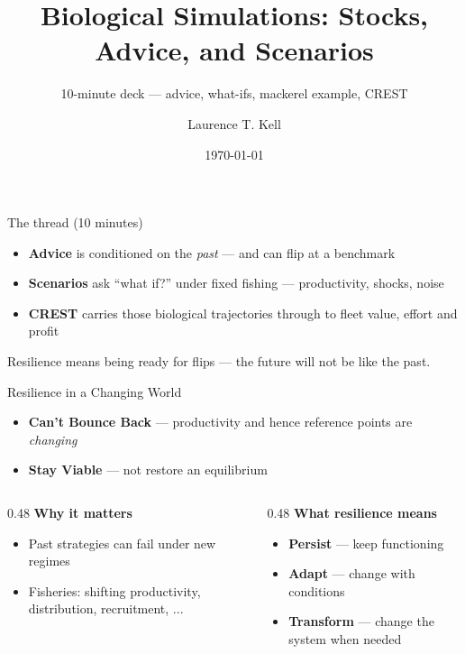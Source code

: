 \documentclass[12pt,aspectratio=169]{beamer}
\title[BIM Resilience --- 10 min]{Biological Simulations: Stocks, Advice, and Scenarios}
\subtitle{10-minute deck --- advice, what-ifs, mackerel example, CREST}
\author{Laurence T. Kell}
\institute{BIM Resilience Project}
\date{\today}
\begin{document}

\begin{frame}{The thread (10 minutes)}
  \begin{itemize}
    \item \textbf{Advice} is conditioned on the \emph{past} --- and can flip at a benchmark
    \item \textbf{Scenarios} ask ``what if?'' under fixed fishing --- productivity, shocks, noise
    \item \textbf{CREST} carries those biological trajectories through to fleet value, effort and profit
  \end{itemize}
  \vspace{4mm}
  {\footnotesize\textcolor{bimsteel}{Resilience means being ready for flips --- the future will not be like the past.}}
\end{frame}

\begin{frame}{Resilience in a Changing World}
  \footnotesize
  \begin{itemize}
    \item \textbf{Can't Bounce Back} --- productivity and hence reference points are \emph{changing}
    \item \textbf{Stay Viable} --- not restore an equilibrium
  \end{itemize}
  \vspace{2mm}
  \begin{columns}[T]
    \begin{column}{0.48\textwidth}
      \textbf{Why it matters}
      \begin{itemize}
        \item Past strategies can fail under new regimes
        \item Fisheries: shifting productivity, distribution, recruitment, ...
      \end{itemize}
    \end{column}
    \begin{column}{0.48\textwidth}
      \textbf{What resilience means}
      \begin{itemize}
        \item \textbf{Persist} --- keep functioning
        \item \textbf{Adapt} --- change with conditions
        \item \textbf{Transform} --- change the system when needed
      \end{itemize}
    \end{column}
  \end{columns}
\end{frame}
\end{document}
